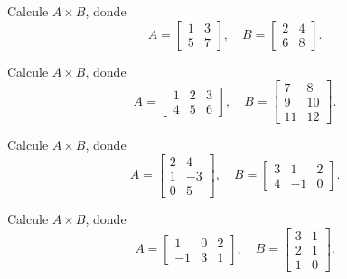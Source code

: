 \begin{ejercicio}
Calcule $A \times B$, donde
\[
A=\begin{bmatrix} 1 & 3 \\ 5 & 7 \end{bmatrix}, \quad
B=\begin{bmatrix} 2 & 4 \\ 6 & 8 \end{bmatrix}.
\]
\end{ejercicio}
\muestraSolucion{
\[
AB=\begin{bmatrix} 20 & 28 \\ 52 & 76 \end{bmatrix}.
\]
}

\begin{ejercicio}
Calcule $A \times B$, donde
\[
A=\begin{bmatrix} 1 & 2 & 3 \\ 4 & 5 & 6 \end{bmatrix}, \quad
B=\begin{bmatrix} 7 & 8 \\ 9 & 10 \\ 11 & 12 \end{bmatrix}.
\]
\end{ejercicio}
\muestraSolucion{
\[
AB=\begin{bmatrix} 58 & 64 \\ 139 & 154 \end{bmatrix}.
\]
}

\begin{ejercicio}
Calcule $A \times B$, donde
\[
A=\begin{bmatrix} 2 & 4 \\ 1 & -3 \\ 0 & 5 \end{bmatrix}, \quad
B=\begin{bmatrix} 3 & 1 & 2 \\ 4 & -1 & 0 \end{bmatrix}.
\]
\end{ejercicio}
\muestraSolucion{
\[
AB=\begin{bmatrix} 22 & -2 & 4 \\ -9 & 4 & 2 \\ 20 & -5 & 0 \end{bmatrix}.
\]
}

\begin{ejercicio}
Calcule $A \times B$, donde
\[
A=\begin{bmatrix} 1 & 0 & 2 \\ -1 & 3 & 1 \end{bmatrix}, \quad
B=\begin{bmatrix} 3 & 1 \\ 2 & 1 \\ 1 & 0 \end{bmatrix}.
\]
\end{ejercicio}
\muestraSolucion{
\[
AB=\begin{bmatrix} 5 & 1 \\ 4 & 2 \end{bmatrix}.
\]
}

